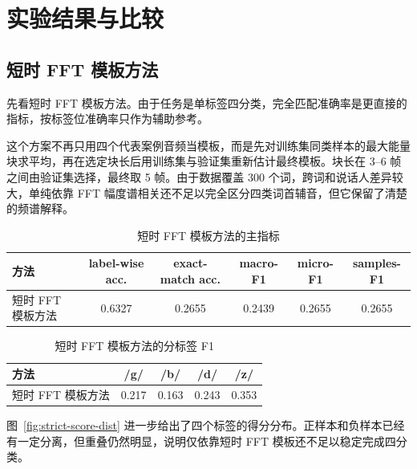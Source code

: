 \section{实验结果与比较}

\subsection{短时 FFT 模板方法}

先看短时 FFT 模板方法。由于任务是单标签四分类，完全匹配准确率是更直接的指标，按标签位准确率只作为辅助参考。

这个方案不再只用四个代表案例音频当模板，而是先对训练集同类样本的最大能量块求平均，再在选定块长后用训练集与验证集重新估计最终模板。块长在 3--6 帧之间由验证集选择，最终取 5 帧。由于数据覆盖 300 个词，跨词和说话人差异较大，单纯依靠 FFT 幅度谱相关还不足以完全区分四类词首辅音，但它保留了清楚的频谱解释。

\begin{table}[H]
    \centering
    \caption{短时 FFT 模板方法的主指标}
    \label{tab:strict-main}
    \begin{tabular}{lccccc}
        \toprule
        方法 & label-wise acc. & exact-match acc. & macro-F1 & micro-F1 & samples-F1 \\
        \midrule
        短时 FFT 模板方法 & 0.6327 & 0.2655 & 0.2439 & 0.2655 & 0.2655 \\
        \bottomrule
    \end{tabular}
\end{table}

\begin{table}[H]
    \centering
    \caption{短时 FFT 模板方法的分标签 F1}
    \label{tab:strict-per-label}
    \begin{tabular}{lcccc}
        \toprule
        方法 & /g/ & /b/ & /d/ & /z/ \\
        \midrule
        短时 FFT 模板方法 & 0.217 & 0.163 & 0.243 & 0.353 \\
        \bottomrule
    \end{tabular}
\end{table}

图~\ref{fig:strict-score-dist} 进一步给出了四个标签的得分分布。正样本和负样本已经有一定分离，但重叠仍然明显，说明仅依靠短时 FFT 模板还不足以稳定完成四分类。

